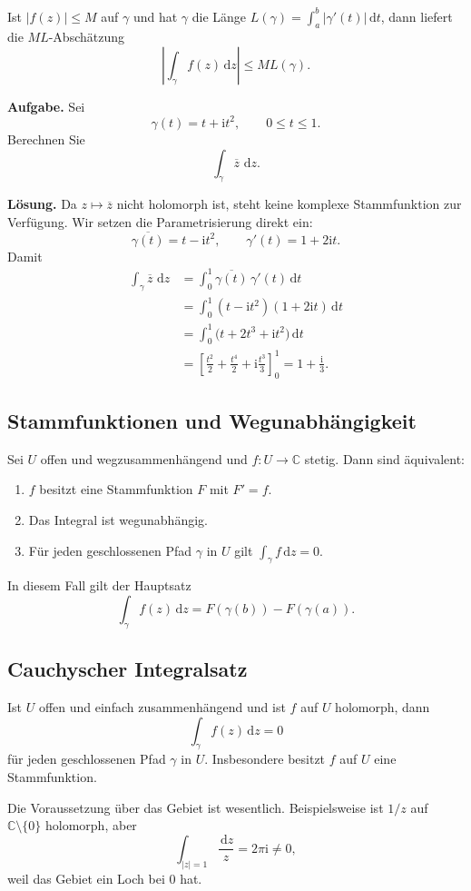 \documentclass[11pt,a4paper]{article}
\newcommand{\C}{\mathbb C}
\newcommand{\ii}{\mathrm i}
\newcommand{\dd}{\,\mathrm d}
\newcommand{\1}{\mathbf 1}
\begin{document}
{Ist $|f(z)|\le M$ auf $\gamma$ und hat $\gamma$ die Länge
$L(\gamma)=\int_a^b|\gamma'(t)|\dd t$, dann liefert die $ML$-Abschätzung
\[
\left|\int_\gamma f(z)\dd z\right|\le ML(\gamma).
\]

\begin{beispielbox}[title=Vorgerechnetes Beispiel: Integral mit Konjugation]
\textbf{Aufgabe.} Sei
\[
\gamma(t)=t+\ii t^2,\qquad 0\le t\le1.
\]
Berechnen Sie
\[
\int_\gamma\overline z\,\dd z.
\]

\textbf{Lösung.} Da $z\mapsto\overline z$ nicht holomorph ist, steht keine
komplexe Stammfunktion zur Verfügung. Wir setzen die Parametrisierung direkt ein:
\[
\overline{\gamma(t)}=t-\ii t^2,\qquad
\gamma'(t)=1+2\ii t.
\]
Damit
\[
\begin{aligned}
\int_\gamma\overline z\,\dd z
&=\int_0^1\overline{\gamma(t)}\,\gamma'(t)\dd t\\
&=\int_0^1(t-\ii t^2)(1+2\ii t)\dd t\\
&=\int_0^1\bigl(t+2t^3+\ii t^2\bigr)\dd t\\
&=\left[\frac{t^2}{2}+\frac{t^4}{2}
+\ii\frac{t^3}{3}\right]_0^1
=1+\frac{\ii}{3}.
\end{aligned}
\]
\end{beispielbox}

\subsection{Stammfunktionen und Wegunabhängigkeit}
Sei $U$ offen und wegzusammenhängend und $f:U\to\C$ stetig. Dann sind äquivalent:
\begin{enumerate}
\item $f$ besitzt eine Stammfunktion $F$ mit $F'=f$.
\item Das Integral ist wegunabhängig.
\item Für jeden geschlossenen Pfad $\gamma$ in $U$ gilt $\int_\gamma f\dd z=0$.
\end{enumerate}
In diesem Fall gilt der Hauptsatz
\[
\int_\gamma f(z)\dd z=F(\gamma(b))-F(\gamma(a)).
\]

\subsection{Cauchyscher Integralsatz}
\begin{satzbox}
Ist $U$ offen und einfach zusammenhängend und ist $f$ auf $U$ holomorph, dann
\[
\int_\gamma f(z)\dd z=0
\]
für jeden geschlossenen Pfad $\gamma$ in $U$. Insbesondere besitzt $f$ auf $U$ eine
Stammfunktion.
\end{satzbox}
Die Voraussetzung über das Gebiet ist wesentlich. Beispielsweise ist $1/z$ auf
$\C\setminus\{0\}$ holomorph, aber
\[
\int_{|z|=1}\frac{\dd z}{z}=2\pi\ii\neq0,
\]
weil das Gebiet ein Loch bei $0$ hat.

}
\end{document}
